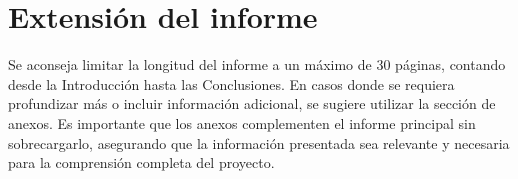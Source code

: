 \chapter{Extensión del informe}
Se aconseja limitar la longitud del informe a un máximo de 30 páginas, contando desde la Introducción hasta las Conclusiones. En casos donde se requiera profundizar más o incluir información adicional, se sugiere utilizar la sección de anexos. Es importante que los anexos complementen el informe principal sin sobrecargarlo, asegurando que la información presentada sea relevante y necesaria para la comprensión completa del proyecto. 
